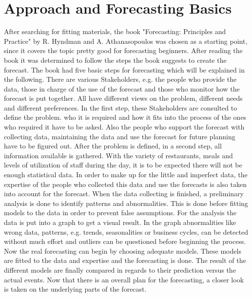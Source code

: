 \section{Approach and Forecasting Basics}\label{section:Approach and Basics}
After searching for fitting materials, the book "Forecasting: Principles and Practice" by R. Hyndman and A. Athanasopoulos\cite{Hyndman.2013} was chosen as a starting point, since it covers the topic pretty good for forecasting beginners. After reading the book it was determined to follow the steps the book suggests to create the forecast. The book had five basic steps for forecasting which will be explained in the following.\newline
There are various Stakeholders, e.g. the people who provide the data, those in charge of the use of the forecast and those who monitor how the forecast is put together. All have different views on the problem, different needs and different preferences. In the first step, these Stakeholders are consulted to define the problem.  who it is required and how it fits into the process of the ones who required it have to be asked. Also the people who support the forecast with collecting data, maintaining the data and use the forecast for future planning have to be figured out. After the problem is defined, in a second step, all information available is gathered. With the variety of restaurants, meals and levels of utilization of staff during the day, it is to be expected there will not be enough statistical data. In order to make up for the little and imperfect data, the expertise of the people who collected this data and use the forecasts is also taken into account for the forecast. When the data collecting is finished, a preliminary analysis is done to identify patterns and abnormalities. This is done before fitting models to the data in order to prevent false assumptions. For the analysis the data is put into a graph to get a visual result. In the graph abnormalities like wrong data, patterns, e.g. trends, seasonalities or business cycles, can be detected without much effort and outliers can be questioned before beginning the process. Now the real forecasting can begin by choosing adequate models. These models are fitted to the data and expertise and the forecasting is done. The result of the different models are finally compared in regards to their prediction versus the actual events.\newline
Now that there is an overall plan for the forecasting, a closer look is taken on the underlying parts of the forecast.

